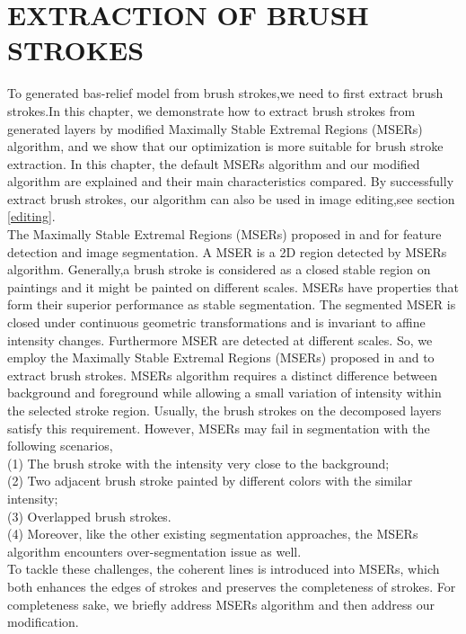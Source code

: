 \clearpage
\chapter{EXTRACTION OF BRUSH STROKES}
To generated bas-relief model from brush strokes,we need to first extract brush strokes.In this chapter, we demonstrate how to extract brush strokes from generated layers by modified Maximally Stable Extremal Regions (MSERs) algorithm, and we show that our optimization is more suitable for brush stroke extraction. In this chapter, the default MSERs algorithm and our modified algorithm are explained and their main characteristics compared. By successfully extract brush strokes, our algorithm can also be used in image editing,see section \ref{editing}.\\
The Maximally Stable Extremal Regions (MSERs) proposed in \cite{donoser2006efficient} and \cite{nister2008linear}for feature detection and image segmentation. A MSER is a 2D region detected by MSERs algorithm.  Generally,a brush stroke is considered as a closed stable region on paintings and it might be painted on different scales. MSERs have properties that form their superior performance as stable segmentation. The segmented MSER is closed under continuous geometric transformations and is invariant to affine intensity changes. Furthermore MSER are detected at different scales. So, we employ the Maximally Stable Extremal Regions (MSERs) proposed in \cite{donoser2006efficient} and \cite{nister2008linear} to extract brush strokes. MSERs algorithm requires a distinct difference between background and foreground while allowing a small variation of intensity within the selected stroke region. Usually, the brush strokes on the decomposed layers satisfy this requirement.
However, MSERs may fail in segmentation with the following scenarios,\\ 
(1) The brush stroke with the intensity very close to the background; \\
(2) Two adjacent brush stroke painted by different colors with the similar intensity;\\
(3) Overlapped brush strokes.\\
(4) Moreover, like the other existing segmentation approaches, the MSERs algorithm encounters over-segmentation issue as well. \\
To tackle these challenges, the coherent lines \cite{kang2007coherent} is introduced into MSERs, which both enhances the edges of strokes and preserves the completeness of strokes. For completeness sake, we briefly address MSERs algorithm and then address our modification.
